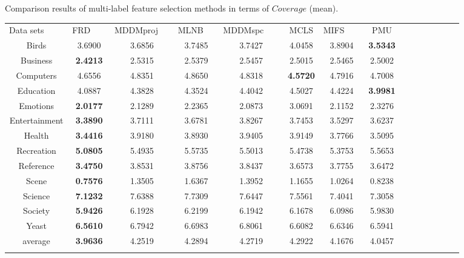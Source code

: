 \documentclass[final,3p,times]{elsarticle}
\begin{document}
\begin{table5-3*}
\begin{center}
\caption{Comparison results of multi-label feature selection methods in terms of $Coverage$ (mean).}
\label{tab:1}
\begin{tabular}{ccccccccccccccc}
\hline\noalign{\smallskip}
Data sets   ~~~~& FRD ~~~& MDDMproj ~~& MLNB  ~~& MDDMspc ~~~& MCLS & MIFS ~~~& PMU \\
\noalign{\smallskip}\hline\noalign{\smallskip}
Birds &	        3.6900 &   3.6856  &  3.7485  &  3.7427  &  4.0458  &  3.8904  &  \textbf{3.5343}  \\

Business &	    \textbf{2.4213}  &  2.5315  &  2.5379  &  2.5457  &  2.5015  &  2.5465  &  2.5002 \\

Computers &	    4.6556  &  4.8351  &  4.8650  &  4.8318  &  \textbf{4.5720}  &  4.7916  &  4.7008   \\

Education &	    4.0887   & 4.3828  &  4.3524  &  4.4042  &  4.5027  &  4.4224  &  \textbf{3.9981}   \\

Emotions &	    \textbf{2.0177}  &  2.1289  &  2.2365  &  2.0873  &  3.0691  &  2.1152  &  2.3276   \\

Entertainment & \textbf{3.3890}  &  3.7111  &  3.6781  &  3.8267  &  3.7453  &  3.5297  &  3.6237   \\

Health  &	    \textbf{3.4416}  &  3.9180  &  3.8930  &  3.9405  &  3.9149  &  3.7766  &  3.5095  \\

Recreation &    \textbf{5.0805}   & 5.4935   & 5.5735  &  5.5013   & 5.4738  &  5.3753   & 5.5653   \\

Reference &	    \textbf{3.4750}  &  3.8531  &  3.8756  &  3.8437  &  3.6573  &  3.7755  &  3.6472   \\


Scene &	        \textbf{0.7576}  &  1.3505  &  1.6367  &  1.3952  &  1.1655  &  1.0264  &  0.8238  \\

Science &	    \textbf{7.1232}  &  7.6388  &  7.7309  &  7.6447  &  7.5561  &  7.4041  &  7.3058   \\

Society &	    \textbf{5.9426}  &  6.1928  &  6.2199  &  6.1942  &  6.1678  & 6.0986   & 5.9830    \\

Yeast &	        \textbf{6.5610}  &  6.7942  &  6.6983  &  6.8061  &  6.6082  &  6.6346  &  6.5941  \\

average &       \textbf{3.9636}  &  4.2519  &  4.2894  &  4.2719  &  4.2922  &  4.1676  &  4.0457  \\
\noalign{\smallskip}\hline
\end{tabular}
\end{center}
\end{table5-3*}
\end{document}
